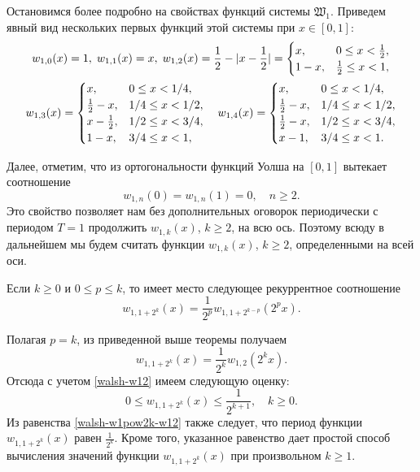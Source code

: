 Остановимся более подробно на свойствах функций системы $\mathfrak{W}_1$.
Приведем явный вид нескольких первых функций этой системы при $x \in [0,1]$:
\begin{gather}\label{walsh-w12}
w_{1,0}(x)=1, \;
w_{1,1}(x)=x, \;
w_{1,2}(x)=\frac{1}{2}-|x-\frac{1}{2}|=
\begin{cases}
x, &0 \le x < \frac{1}{2},\\
1-x, &\frac{1}{2} \le x < 1,
\end{cases}\\
\notag
w_{1,3}(x)=
\begin{cases}
x, &0 \le x < 1/4,\\
\frac{1}{2}-x, &1/4 \le x < 1/2,\\
x-\frac{1}{2}, &1/2 \le x < 3/4,\\
1-x, &3/4 \le x < 1,
\end{cases}
\quad
w_{1,4}(x)=
\begin{cases}
x, &0 \le x < 1/4,\\
\frac{1}{2}-x, &1/4 \le x < 1/2,\\
\frac{1}{2}-x, &1/2 \le x < 3/4,\\
x-1 , &3/4 \le x < 1.
\end{cases}
\end{gather}

Далее, отметим, что из ортогональности функций Уолша на $[0,1]$ вытекает соотношение
\begin{equation*}
w_{1,n}(0)=w_{1,n}(1)=0, \quad n \ge 2.
\end{equation*}
Это свойство позволяет нам без дополнительных оговорок периодически с периодом $T=1$ продолжить $w_{1,k}(x)$, $k \ge 2$, на всю ось. Поэтому
всюду в дальнейшем мы будем считать функции $w_{1,k}(x)$, $k \ge 2$, определенными на всей оси.
\begin{theorem}
	Если $k \ge 0$ и $0 \le p \le k$, то имеет место следующее рекуррентное соотношение
	\begin{equation*}
	w_{1,1+2^k}(x)=\frac{1}{2^p}w_{1,1+2^{k-p}}(2^p x).
	\end{equation*}
\end{theorem}

Полагая $p=k$, из приведенной выше теоремы получаем
\begin{equation}\label{walsh-w1pow2k-w12}
w_{1,1+2^k}(x)=\frac{1}{2^k}w_{1,2}(2^k x).
\end{equation}
Отсюда с учетом \eqref{walsh-w12} имеем следующую оценку:
\begin{equation}\label{walsh-w12k-est}
0 \le w_{1,1+2^k}(x) \le \frac{1}{2^{k+1}}, \quad k \ge 0.
\end{equation}
Из равенства \eqref{walsh-w1pow2k-w12} также следует, что период функции $w_{1,1+2^k}(x)$ равен $\frac{1}{2^k}$.
Кроме того, указанное равенство дает простой способ вычисления значений функции $w_{1,1+2^k}(x)$ при произвольном $k \ge 1$.

